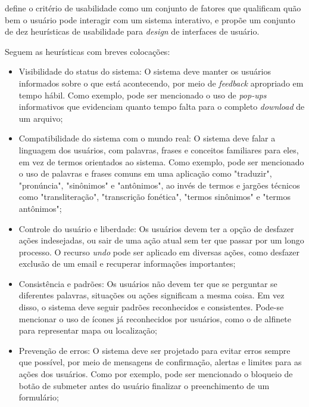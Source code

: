  define o critério de usabilidade como um conjunto de fatores que qualificam 
quão bem o usuário pode interagir com um sistema interativo, e propõe um conjunto de dez 
heurísticas de usabilidade para \textit{design} de interfaces de usuário.

\begin{description}
  \item Seguem as heurísticas com breves colocações:
        \begin{itemize}
            \item Visibilidade do status do sistema: O sistema deve manter os usuários informados sobre o que está 
            acontecendo, por meio de \textit{feedback} apropriado em tempo hábil. Como exemplo, pode ser mencionado 
            o uso de \textit{pop-ups} informativos que evidenciam quanto tempo falta para o completo \textit{download} de um arquivo;

            \item Compatibilidade do sistema com o mundo real: O sistema deve falar a linguagem dos usuários, com 
            palavras, frases e conceitos familiares para eles, em vez de termos orientados ao sistema. Como exemplo, pode ser 
            mencionado o uso de palavras e frases comuns em uma aplicação como "traduzir", "pronúncia", "sinônimos" e "antônimos", 
            ao invés de termos e jargões técnicos como "transliteração", "transcrição fonética", "termos sinônimos" e "termos antônimos";

            \item Controle do usuário e liberdade: Os usuários devem ter a opção de desfazer ações indesejadas, ou sair 
            de uma ação atual sem ter que passar por um longo processo. O recurso \textit{undo} pode ser aplicado em diversas ações, como 
            desfazer exclusão de um email e recuperar informações importantes;

            \item Consistência e padrões: Os usuários não devem ter que se perguntar se diferentes palavras, situações 
            ou ações significam a mesma coisa. Em vez disso, o sistema deve seguir padrões reconhecidos e consistentes. Pode-se mencionar o uso 
            de ícones já reconhecidos por usuários, como o de alfinete para representar mapa ou localização;

            \item Prevenção de erros: O sistema deve ser projetado para evitar erros sempre que possível, por meio de 
            mensagens de confirmação, alertas e limites para as ações dos usuários. Como por exemplo, pode ser mencionado 
            o bloqueio de botão de submeter antes do usuário finalizar o preenchimento de um formulário;
            

\end{itemize}
\end{description}
